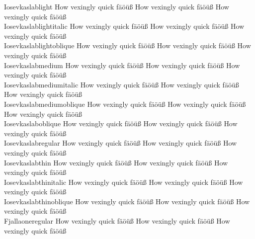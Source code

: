 \begin{tabbing}
Iosevkaslablight \> {\mktsStyleNormal{}How vexingly quick fäöüß} {\mktsFontfileIosevkaslablight{}How vexingly quick fäöüß} {\mktsStyleItalic{}How vexingly quick fäöüß} \\
Iosevkaslablightitalic \> {\mktsStyleNormal{}How vexingly quick fäöüß} {\mktsFontfileIosevkaslablightitalic{}How vexingly quick fäöüß} {\mktsStyleItalic{}How vexingly quick fäöüß} \\
Iosevkaslablightoblique \> {\mktsStyleNormal{}How vexingly quick fäöüß} {\mktsFontfileIosevkaslablightoblique{}How vexingly quick fäöüß} {\mktsStyleItalic{}How vexingly quick fäöüß} \\
Iosevkaslabmedium \> {\mktsStyleNormal{}How vexingly quick fäöüß} {\mktsFontfileIosevkaslabmedium{}How vexingly quick fäöüß} {\mktsStyleItalic{}How vexingly quick fäöüß} \\
Iosevkaslabmediumitalic \> {\mktsStyleNormal{}How vexingly quick fäöüß} {\mktsFontfileIosevkaslabmediumitalic{}How vexingly quick fäöüß} {\mktsStyleItalic{}How vexingly quick fäöüß} \\
Iosevkaslabmediumoblique \> {\mktsStyleNormal{}How vexingly quick fäöüß} {\mktsFontfileIosevkaslabmediumoblique{}How vexingly quick fäöüß} {\mktsStyleItalic{}How vexingly quick fäöüß} \\
Iosevkaslaboblique \> {\mktsStyleNormal{}How vexingly quick fäöüß} {\mktsFontfileIosevkaslaboblique{}How vexingly quick fäöüß} {\mktsStyleItalic{}How vexingly quick fäöüß} \\
Iosevkaslabregular \> {\mktsStyleNormal{}How vexingly quick fäöüß} {\mktsFontfileIosevkaslabregular{}How vexingly quick fäöüß} {\mktsStyleItalic{}How vexingly quick fäöüß} \\
Iosevkaslabthin \> {\mktsStyleNormal{}How vexingly quick fäöüß} {\mktsFontfileIosevkaslabthin{}How vexingly quick fäöüß} {\mktsStyleItalic{}How vexingly quick fäöüß} \\
Iosevkaslabthinitalic \> {\mktsStyleNormal{}How vexingly quick fäöüß} {\mktsFontfileIosevkaslabthinitalic{}How vexingly quick fäöüß} {\mktsStyleItalic{}How vexingly quick fäöüß} \\
Iosevkaslabthinoblique \> {\mktsStyleNormal{}How vexingly quick fäöüß} {\mktsFontfileIosevkaslabthinoblique{}How vexingly quick fäöüß} {\mktsStyleItalic{}How vexingly quick fäöüß} \\
Fjallaoneregular \> {\mktsStyleNormal{}How vexingly quick fäöüß} {\Fjallaoneregular{}How vexingly quick fäöüß} {\mktsStyleItalic{}How vexingly quick fäöüß} \\

\end{tabbing}
